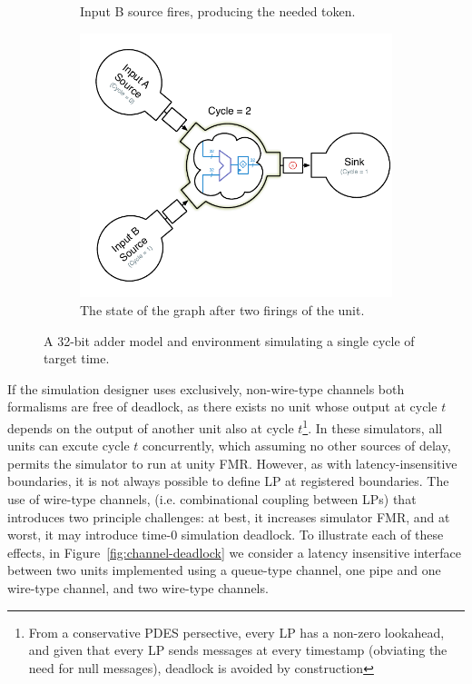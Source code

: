 \begin{figure}
\begin{subfigure}[t]{0.49\textwidth}
        \caption{Input B source fires, producing the needed token.}
    \end{subfigure}
    \begin{subfigure}[t]{0.49\textwidth}
        \includegraphics[width=\columnwidth]{figures/adder-example5.pdf}
        \caption{The state of the graph after two firings of the unit.}
    \end{subfigure}
    \centering
    \vspace{-0.25in}
    \caption{A 32-bit adder model and environment simulating a single cycle of target time.}
    \label{fig:adder-example}
\end{figure}

If the simulation designer uses exclusively, non-wire-type channels both
formalisms are free of deadlock, as there exists no unit whose output at cycle
$t$ depends on the output of another unit also at cycle $t$\footnote{From a
conservative PDES persective, every LP has a non-zero lookahead, and given that
every LP sends messages at every timestamp (obviating the need for null
messages), deadlock is avoided by construction}. In these simulators, all units
can excute cycle $t$ concurrently, which assuming no other sources of delay,
permits the simulator to run at unity FMR.  However, as with latency-insensitive boundaries, it is not always possible to define LP
at registered boundaries.  The use of wire-type channels, (i.e. combinational
coupling between LPs) that introduces two principle challenges: at best, it
increases simulator FMR, and at worst, it may introduce time-0 simulation
deadlock. To illustrate each of these effects, in Figure~\ref{fig:channel-deadlock} we consider a
latency insensitive interface between two units implemented using a queue-type
channel, one pipe and one wire-type channel, and two wire-type channels.

